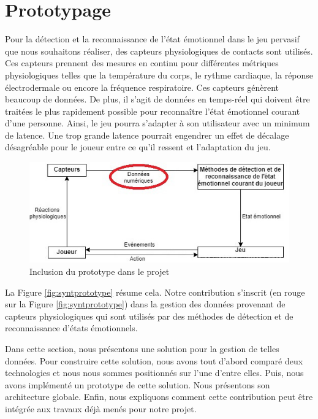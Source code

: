 \documentclass[11pt]{article}
\begin{document}
\section{Prototypage}\label{sec:prototypage}
	Pour la détection et la reconnaissance de l'état émotionnel dans le jeu pervasif que nous souhaitons réaliser, des  capteurs physiologiques de contacts sont utilisés.
	Ces capteurs prennent des mesures en continu pour différentes métriques physiologiques telles que la température du corps, le rythme cardiaque, la réponse électrodermale ou encore la fréquence respiratoire.
	Ces capteurs génèrent beaucoup de données.
	De plus, il s'agit de données en temps-réel qui doivent être traitées le plus rapidement possible pour reconnaître l'état émotionnel courant d'une personne. 
	Ainsi, le jeu pourra s'adapter à son utilisateur avec un minimum de latence. 
	Une trop grande latence pourrait engendrer un effet de décalage désagréable pour le joueur entre ce qu'il ressent et l'adaptation du jeu.
	\begin{figure}
		\centering
		\includegraphics[scale=0.8]{../include/explication-prototype.jpg}
		\caption{Inclusion du prototype dans le projet}
		\label{syntprototype}
	\end{figure}
	La Figure \ref{fig:syntprototype} résume cela.
	Notre contribution s'inscrit (en rouge sur la Figure \ref{fig:syntprototype}) dans la gestion des données provenant de capteurs physiologiques qui sont utilisés par des méthodes de détection et de reconnaissance d'états émotionnels. \par
	Dans cette section, nous présentons une solution pour la gestion de telles données. 
	Pour construire cette solution, nous avons tout d'abord comparé deux technologies et nous nous sommes positionnés sur l'une d'entre elles.
	Puis, nous avons implémenté un prototype de cette solution.
	Nous présentons son architecture globale.
	Enfin, nous expliquons comment cette contribution peut être intégrée aux travaux déjà menés pour notre projet.
\end{document}

